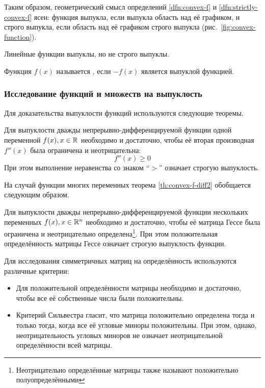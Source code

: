 Таким образом, геометрический смысл определений \ref{dfn:convex-f} и
\ref{dfn:strictly-convex-f} ясен: функция выпукла, если выпукла
область над её графиком, и строго выпукла, если область над её
графиком строго выпукла (рис. \ref{fig:convex-function}).



\begin{rem}
  \label{rem:lin-f-convex}
  Линейные функции выпуклы, но не строго выпуклы.
\end{rem}
\begin{dfn}
  Функция $f(x)$ называется , если $-f(x)$ является
  выпуклой функцией.
\end{dfn}

\subsubsection{Исследование функций и множеств на выпуклость}
\label{sec:convex-analysis}
Для доказательства выпуклости функций используются следующие теоремы.

\begin{thm}
  \label{th:convex-f-diff2}
  Для выпуклости дважды непрерывно-дифференцируемой функции одной
  переменной $f(x), x \in \mathbb{R}$ необходимо и достаточно, чтобы её
  вторая производная $f''(x)$ была ограничена и неотрицательна:
  \begin{equation*}
    f''(x) \geq 0
  \end{equation*}
  При этом выполнение неравенства со знаком {\rm``$>$''\/}\! означает
  строгую выпуклость.
\end{thm}

На случай функции многих переменных теорема \ref{th:convex-f-diff2}
обобщается следующим образом.
\begin{thm}
  \label{th:convex-f-hess}
  Для выпуклости дважды непрерывно-дифференцируемой функции нескольких
  переменных $f(x), x \in \mathbb{R}^n$ необходимо и достаточно, чтобы её
  матрица Гессе была ограничена и неотрицательно
  определена\footnote{Неотрицательно определённые матрицы также
    называют положительно полуопределёнными}. При этом положительная
  определённость матрицы Гессе означает строгую выпуклость функции.
\end{thm}
\clearpage
Для исследования симметричных матриц на определённость используются
различные критерии:
\begin{itemize}
\item Для положительной определённости матрицы необходимо и
  достаточно, чтобы все её собственные числа были положительны.
\item Критерий Сильвестра гласит, что матрица положительно определена
  тогда и только тогда, когда все её угловые миноры положительны. При
  этом, однако, неотрицательность угловых миноров не означает
  неотрицательной определённости всей матрицы.
\end{itemize}

